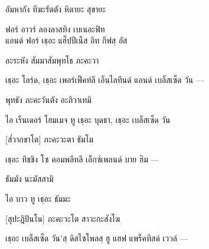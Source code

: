 อัมหากัง ทีฆะรัตตัง หิตายะ สุขายะ

\begin{english}
ฟอร์ อาวร์ ลองลาสทิง เบเนอะฟิท\\
\vin แอนด์ ฟอร์ เธฺอะ แฮ็ปปีเน็ส อิท กีฟสฺ อัส
\end{english}

อะระหัง สัมมาสัมพุทโธ ภะคะวา

\begin{english}
เธฺอะ โลร์ด, เธฺอะ เพอร์เฟ็คท์ลี เอ็นไลทึนด์ แอนด์ เบล็สเซ็ด วัน —
\end{english}

พุทธัง ภะคะวันตัง อะภิวาเทมิ

\begin{english}
ไอ เร็นเดอร์ โฮมเมจ ทู เธฺอะ บุดธา, เธฺอะ เบล็สเซ็ด วัน  
\end{english}

[ส๎วากขาโต] ภะคะวะตา ธัมโม

\begin{english}
เธฺอะ ทีชชิง  โซ คอมพลีทลี เอ็กซ์เพลนด์ บาย ฮิม —
\end{english}

ธัมมัง นะมัสสามิ

\begin{english}
	ไอ บาว ทู เธฺอะ ธัมมะ  
\end{english}

[สุปะฏิปันโน] ภะคะวะโต สาวะกะสังโฆ

\begin{english}
เธฺอะ เบล็สเซ็ด วัน’สฺ ดิสไซโพลสฺ ฮู แฮฟ แพร็คทิสด์ เววล์ —
\end{english}

